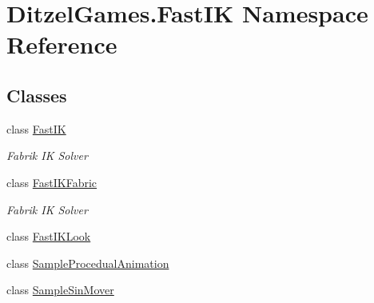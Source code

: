 \hypertarget{namespace_ditzel_games_1_1_fast_i_k}{}\section{Ditzel\+Games.\+Fast\+IK Namespace Reference}
\label{namespace_ditzel_games_1_1_fast_i_k}
\subsection*{Classes}
\begin{DoxyCompactItemize}
\item 
class \mbox{\hyperlink{class_ditzel_games_1_1_fast_i_k_1_1_fast_i_k}{Fast\+IK}}
\begin{DoxyCompactList}\small\item\em Fabrik IK Solver \end{DoxyCompactList}\item 
class \mbox{\hyperlink{class_ditzel_games_1_1_fast_i_k_1_1_fast_i_k_fabric}{Fast\+I\+K\+Fabric}}
\begin{DoxyCompactList}\small\item\em Fabrik IK Solver \end{DoxyCompactList}\item 
class \mbox{\hyperlink{class_ditzel_games_1_1_fast_i_k_1_1_fast_i_k_look}{Fast\+I\+K\+Look}}
\item 
class \mbox{\hyperlink{class_ditzel_games_1_1_fast_i_k_1_1_sample_procedual_animation}{Sample\+Procedual\+Animation}}
\item 
class \mbox{\hyperlink{class_ditzel_games_1_1_fast_i_k_1_1_sample_sin_mover}{Sample\+Sin\+Mover}}
\end{DoxyCompactItemize}

